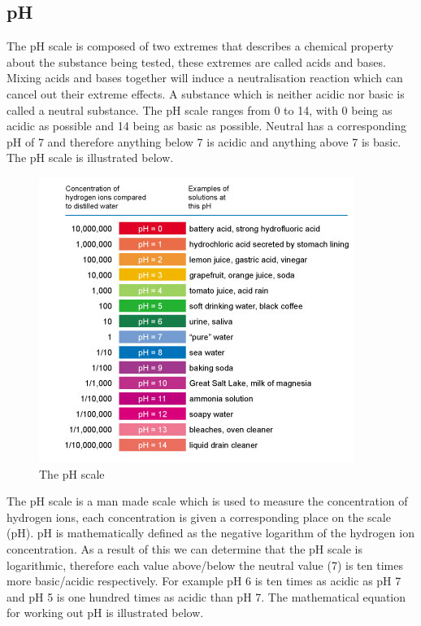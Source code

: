 	\subsection{pH}

The pH scale is composed of two extremes that describes a chemical property about the substance being tested, these extremes are called acids and bases. Mixing acids and bases together will induce a neutralisation reaction which can cancel out their extreme effects. A substance which is neither acidic nor basic is called a neutral substance. The pH scale ranges from 0 to 14, with 0 being as acidic as possible and 14 being as basic as possible. Neutral has a corresponding pH of 7 and therefore anything below 7 is acidic and anything above 7 is basic. The pH scale is illustrated below.


\begin{figure}[H]
    \includegraphics[width=\textwidth]{./Planning/Images/pHScale.jpg}
    \caption{The pH scale} \label{fig:pH Scale}
\end{figure}

The pH scale is a man made scale which is used to measure the concentration of hydrogen ions, each concentration is given a corresponding place on the scale (pH). pH is mathematically defined as the negative logarithm of the hydrogen ion concentration. As a result of this we can determine that the pH scale is logarithmic, therefore each value above/below the neutral value (7) is ten times more basic/acidic respectively. For example pH 6 is ten times as acidic as pH 7  and pH 5 is one hundred times as acidic than pH 7. The mathematical equation for working out pH is illustrated below.

